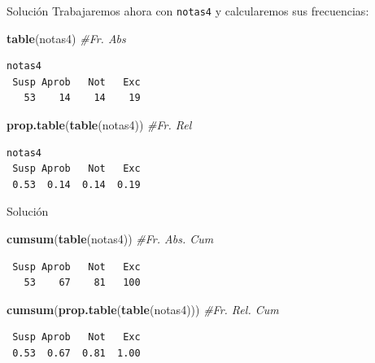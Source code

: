 \documentclass[
  ignorenonframetext,
  aspectratio=169]{beamer}
\newenvironment{Shaded}{\begin{snugshade}}{\end{snugshade}}
\newcommand{\CommentTok}[1]{\textcolor[rgb]{0.56,0.35,0.01}{\textit{#1}}}
\newcommand{\FunctionTok}[1]{\textcolor[rgb]{0.13,0.29,0.53}{\textbf{#1}}}
\newcommand{\NormalTok}[1]{#1}
\begin{document}
\begin{frame}[fragile]{Solución}
\label{soluciuxf3n-25}
Trabajaremos ahora con \texttt{notas4} y calcularemos sus frecuencias:

\begin{Shaded}
\begin{Highlighting}[]
\FunctionTok{table}\NormalTok{(notas4) }\CommentTok{\#Fr. Abs}
\end{Highlighting}
\end{Shaded}

\begin{verbatim}
notas4
 Susp Aprob   Not   Exc 
   53    14    14    19 
\end{verbatim}

\begin{Shaded}
\begin{Highlighting}[]
\FunctionTok{prop.table}\NormalTok{(}\FunctionTok{table}\NormalTok{(notas4)) }\CommentTok{\#Fr. Rel}
\end{Highlighting}
\end{Shaded}

\begin{verbatim}
notas4
 Susp Aprob   Not   Exc 
 0.53  0.14  0.14  0.19 
\end{verbatim}
\end{frame}

\begin{frame}[fragile]{Solución}
\label{soluciuxf3n-26}
\begin{Shaded}
\begin{Highlighting}[]
\FunctionTok{cumsum}\NormalTok{(}\FunctionTok{table}\NormalTok{(notas4)) }\CommentTok{\#Fr. Abs. Cum}
\end{Highlighting}
\end{Shaded}

\begin{verbatim}
 Susp Aprob   Not   Exc 
   53    67    81   100 
\end{verbatim}

\begin{Shaded}
\begin{Highlighting}[]
\FunctionTok{cumsum}\NormalTok{(}\FunctionTok{prop.table}\NormalTok{(}\FunctionTok{table}\NormalTok{(notas4))) }\CommentTok{\#Fr. Rel. Cum}
\end{Highlighting}
\end{Shaded}

\begin{verbatim}
 Susp Aprob   Not   Exc 
 0.53  0.67  0.81  1.00 
\end{verbatim}
\end{frame}
\end{document}
